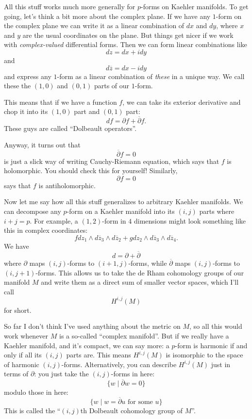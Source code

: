 \documentclass{article}
\begin{document}
All this stuff works much more generally for \(p\)-forms on Kaehler
manifolds. To get going, let's think a bit more about the complex plane.
If we have any \(1\)-form on the complex plane we can write it as a
linear combination of \(dx\) and \(dy\), where \(x\) and \(y\) are the
usual coordinates on the plane. But things get nicer if we work with
\emph{complex-valued} differential forms. Then we can form linear
combinations like \[dz = dx + idy\] and \[d\overline{z} = dx - idy\] and
express any \(1\)-form as a linear combination of \emph{these} in a
unique way. We call these the \((1,0)\) and \((0,1)\) parts of our
\(1\)-form.

This means that if we have a function \(f\), we can take its exterior
derivative and chop it into its \((1,0)\) part and \((0,1)\) part:
\[df = \partial f+\overline{\partial}f.\] These guys are called
``Dolbeault operators''.

Anyway, it turns out that \[\overline{\partial}f = 0\] is just a slick
way of writing Cauchy-Riemann equation, which says that \(f\) is
holomorphic. You should check this for yourself! Similarly,
\[\partial f = 0\] says that \(f\) is antiholomorphic.

Now let me say how all this stuff generalizes to arbitrary Kaehler
manifolds. We can decompose any \(p\)-form on a Kaehler manifold into
its \((i,j)\) parts where \(i+j = p\). For example, a \((1,2)\)-form in
\(4\) dimensions might look something like this in complex coordinates:
\[f dz_1\wedge d\overline{z}_3\wedge d\overline{z}_2 + g dz_2\wedge d\overline{z}_3\wedge d\overline{z}_4.\]
We have \[d = \partial + \overline{\partial}\] where \(\partial\) maps
\((i,j)\)-forms to \((i+1,j)\)-forms, while \(\overline{\partial}\) maps
\((i,j)\)-forms to \((i,j+1)\)-forms. This allows us to take the de Rham
cohomology groups of our manifold \(M\) and write them as a direct sum
of smaller vector spaces, which I'll call \[H^{i,j}(M)\] for short.

So far I don't think I've used anything about the metric on \(M\), so
all this would work whenever \(M\) is a so-called ``complex manifold''.
But if we really have a Kaehler manifold, and it's compact, we can say
more: a \(p\)-form is harmonic if and only if all its \((i,j)\) parts
are. This means \(H^{i,j}(M)\) is isomorphic to the space of harmonic
\((i,j)\)-forms. Alternatively, you can describe \(H^{i,j}(M)\) just in
terms of \(\partial\): you just take the \((i,j)\)-forms in here:
\[\{w \mid \overline{\partial}w = 0\}\] modulo those in here:
\[\{w \mid \mbox{$w=\overline{\partial}u$ for some $u$}\}\] This is
called the ``\((i,j)\)th Dolbeault cohomology group of \(M\)''.
\end{document}
